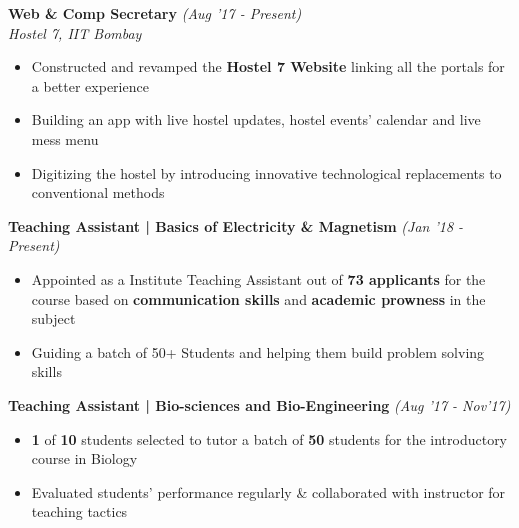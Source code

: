 \documentclass[11pt]{article}%
\begin{document}
\vspace{-0.1cm}
{\flushleft \bf \large{Web \& Comp Secretary}} \hfill {{{\em {(Aug '17 - Present)}}}}\\{\em{Hostel 7, IIT Bombay}}
\begin{itemize}
\setlength\itemsep{0.01em}
\vspace{-0.2cm}
\item Constructed and revamped the \textbf{Hostel 7 Website} linking all the portals for a better experience
\item Building an app with live hostel updates, hostel events’ calendar and live mess menu
\item \nohyphens{Digitizing the hostel by introducing innovative technological replacements to conventional methods}
\end{itemize}
\vspace{-1mm}









\vspace{-0.4cm}
{\flushleft \bf \large{Teaching Assistant | Basics of Electricity \& Magnetism}} \hfill {{{\em {(Jan '18 - Present)}}}}
\begin{itemize}
\setlength\itemsep{0.015em}
\vspace{-0.2cm}
\item Appointed as a Institute Teaching Assistant out of \textbf{73 applicants} for the course based on \textbf{communication skills} and \textbf{academic prowness} in the subject
\vspace{-1mm}
\item Guiding a batch of 50+ Students and helping them build problem solving skills
\end{itemize}
\vspace{-1mm}




\vspace{-0.4cm}
{\flushleft \bf \large{Teaching Assistant | Bio-sciences and Bio-Engineering}} \hfill {{{\em {(Aug '17 - Nov'17)}}}}
\begin{itemize}
\setlength\itemsep{0.015em}
\vspace{-0.2cm}
\item \textbf{1} of \textbf{10} students selected to tutor a batch of \textbf{50} students for the introductory course in Biology
\item Evaluated students' performance regularly & collaborated with instructor for teaching tactics
\end{itemize}
\vspace{-1mm}
\end{document}

